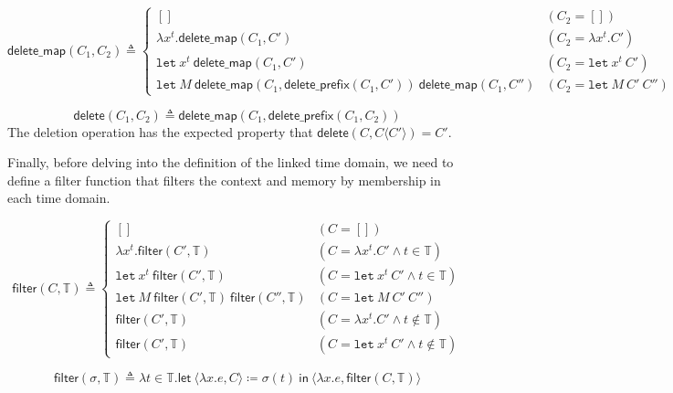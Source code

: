 \documentclass{article}
\theoremstyle{definition}
\newcommand*{\Time}{\mathbb{T}}
\newcommand*{\inject}[2]{{#1}\langle{#2}\rangle}
\newcommand*{\deletepre}{\mathsf{delete\_prefix}}
\newcommand*{\deletemap}{\mathsf{delete\_map}}
\newcommand*{\delete}{\mathsf{delete}}
\newcommand*{\filter}{\mathsf{filter}}
\newcommand*{\Let}{\mathtt{let}}
\begin{document}
\[
  \deletemap(C_{1},C_{2})\triangleq
  \begin{cases}
    []                                                                     & (C_{2}=[])               \\
    \lambda x^{t}.\deletemap(C_{1},C')                                     & (C_{2}=\lambda x^{t}.C') \\
    \Let\:x^{t}\:\deletemap(C_{1},C')                                      & (C_{2}=\Let\:x^{t}\:C')  \\
    \Let\:M\:\deletemap(C_{1},\deletepre(C_{1},C'))\:\deletemap(C_{1},C'') & (C_{2}=\Let\:M\:C'\:C'')
  \end{cases}
\]

\[
  \delete(C_{1},C_{2})\triangleq \deletemap(C_{1},\deletepre(C_{1},C_{2}))
\]
The deletion operation has the expected property that $\delete(C,\inject{C}{C'})=C'$.

Finally, before delving into the definition of the linked time domain, we need to define a filter function that filters the context and memory by membership in each time domain.

\[
  \filter(C,\Time)\triangleq
  \begin{cases}
    []                                             & (C=[])                                   \\
    \lambda x^{t}.\filter(C',\Time)                & (C=\lambda x^{t}.C'\wedge t\in\Time)     \\
    \Let\:x^{t}\:\filter(C',\Time)                 & (C=\Let\:x^{t}\:C'\wedge t\in\Time)      \\
    \Let\:M\:\filter(C',\Time)\:\filter(C'',\Time) & (C=\Let\:M\:C'\:C'')                     \\
    \filter(C',\Time)                              & (C=\lambda x^{t}.C'\wedge t\not\in\Time) \\
    \filter(C',\Time)                              & (C=\Let\:x^{t}\:C'\wedge t\not\in\Time)
  \end{cases}
\]

\[
  \filter(\sigma,\Time)\triangleq
  \lambda t\in\Time.\mathsf{let}\:\langle\lambda x.e,C\rangle\coloneq\sigma(t)\:\mathsf{in}\:\langle\lambda x.e,\filter(C,\Time)\rangle
\]
\end{document}
